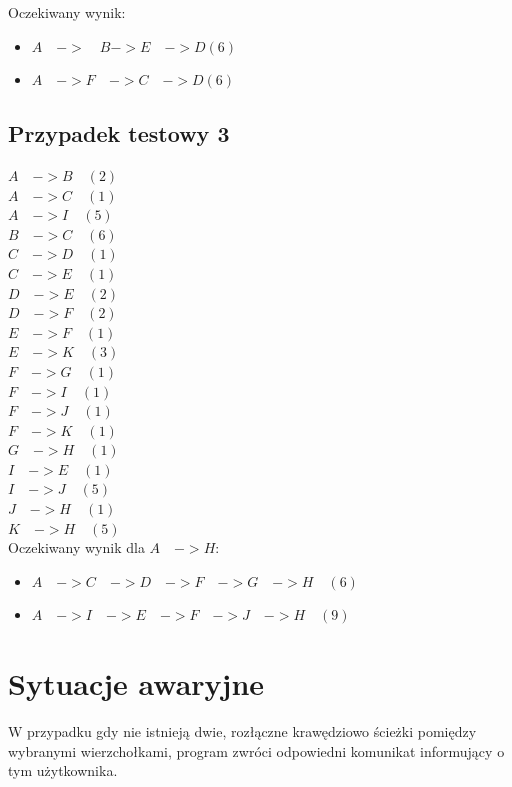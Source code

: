 \documentclass[10pt,a4paper]{article}
\begin{document}
Oczekiwany wynik:\\
\begin{itemize}
	\item $ A \quad -> \quad B -> E\quad -> D (6)$
	\item $ A \quad-> F\quad -> C\quad -> D (6)$\\
\end{itemize}

\subsection{Przypadek testowy 3}
$A\quad -> B \quad(2)$\\
$A\quad -> C\quad (1)$\\
$A \quad-> I\quad (5)$\\
$B\quad -> C\quad (6)$\\
$C \quad-> D\quad (1)$\\
$C\quad -> E\quad (1)$\\
$D \quad-> E\quad (2)$\\
$D\quad -> F \quad(2)$\\
$E \quad-> F \quad(1)$\\
$E \quad-> K \quad(3)$\\
$F\quad -> G\quad (1)$\\
$F \quad-> I\quad (1)$\\
$F\quad -> J \quad(1)$\\
$F\quad -> K \quad(1)$\\
$G\quad -> H \quad(1)$\\
$I\quad -> E \quad(1)$\\
$I \quad-> J \quad(5)$\\
$J \quad-> H \quad(1)$\\
$K\quad -> H\quad (5)$\\

Oczekiwany wynik dla $A \quad -> H:$\\
\begin{itemize}
	\item $ A\quad -> C\quad -> D\quad -> F \quad-> G\quad -> H\quad (6)$
	\item $ A \quad-> I\quad -> E \quad-> F \quad-> J\quad -> H \quad(9)$
\end{itemize}


\section{Sytuacje awaryjne}
W przypadku gdy nie istnieją dwie, rozłączne krawędziowo ścieżki pomiędzy wybranymi wierzchołkami, program zwróci odpowiedni komunikat informujący o tym użytkownika.
\end{document}

